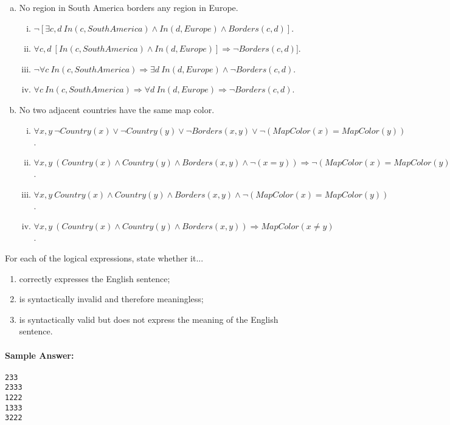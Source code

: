 \documentclass[11pt, answers]{exam}
\begin{document}
\begin{questions}
\begin{enumerate}[a.]
\begin{enumerate}[(i)]
	\end{enumerate}
	\item No region in South America borders any region in Europe.
	\begin{enumerate}[(i)]
		\item $\neg[\exists c, d\ In(c, SouthAmerica) \wedge In(d,Europe) \wedge Borders(c, d)]$.
		\item $\forall c, d\ [In(c, SouthAmerica) \wedge In(d,Europe)] \Rightarrow \neg Borders(c, d)]$.
		\item $\neg \forall c\ In(c, SouthAmerica) \Rightarrow \exists d\ In(d,Europe) \wedge \neg Borders(c, d)$.
		\item $\forall c\ In(c, SouthAmerica) \Rightarrow \forall d\ In(d,Europe) \Rightarrow \neg Borders(c, d)$.
	\end{enumerate}
	\item No two adjacent countries have the same map color.
	\begin{enumerate}[(i)]
		\item $\forall x, y\ \neg Country(x) \vee \neg Country(y) \vee \neg Borders(x, y) \vee \neg (MapColor (x) = MapColor (y))$.
		\item $\forall x, y\ (Country(x) \wedge Country(y) \wedge Borders (x, y) \wedge \neg(x = y)) \Rightarrow \neg(MapColor (x) = MapColor (y))$.
		\item $\forall x, y\ Country(x) \wedge Country(y) \wedge Borders(x, y) \wedge \neg(MapColor (x) = MapColor (y))$.
		\item $\forall x, y\ (Country(x) \wedge Country(y) \wedge Borders (x, y)) \Rightarrow MapColor (x \neq y)$.
	\end{enumerate}
\end{enumerate}

For each of the logical expressions, state whether it...
\begin{enumerate}[1]
\item correctly expresses the English sentence;
\item is syntactically invalid and therefore meaningless; \item is syntactically valid but does not express the meaning of the English sentence.
\end{enumerate}

\paragraph{Sample Answer:}
\begin{verbatim}
233
2333
1222
1333
3222
\end{verbatim}
\end{questions}
\end{document}
